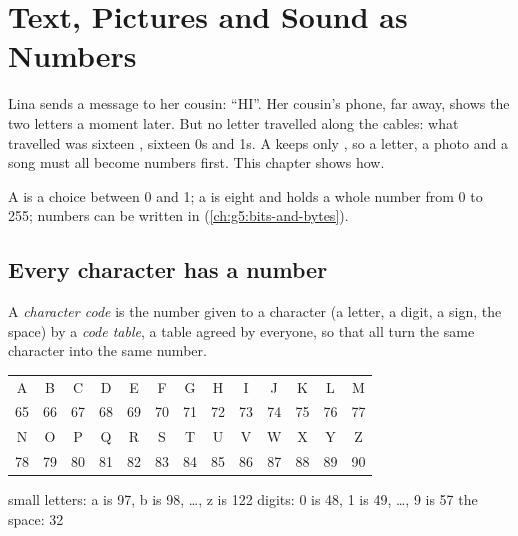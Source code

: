 \chapter{Text, Pictures and Sound as Numbers}\label{ch:g5:text-pictures-sound-as-numbers}

Lina sends a message to her cousin: ``HI''. Her cousin's phone, far away,
shows the two letters a moment later. But no letter travelled along the
cables: what travelled was sixteen , sixteen 0s and 1s. A  keeps
only , so a letter, a photo and a song must all become numbers first. This
chapter shows how.

\begin{recall}
A  is a choice between 0 and 1; a  is eight  and holds a whole
number from 0 to 255; numbers can be written in 
(\cref{ch:g5:bits-and-bytes}).
\end{recall}

\section{Every character has a number}

\begin{definition}\label{def:g5:text-pictures-sound-as-numbers:code}
A \emph{character code} is the number given to a
character (a letter, a digit, a sign, the space) by a \emph{code
table}, a table agreed by everyone, so that all 
turn the same character into the same number.
\end{definition}

\begin{center}
\small
\begin{tabular}{*{13}{c}}
\hline
A & B & C & D & E & F & G & H & I & J & K & L & M \\
65 & 66 & 67 & 68 & 69 & 70 & 71 & 72 & 73 & 74 & 75 & 76 & 77 \\
\hline
N & O & P & Q & R & S & T & U & V & W & X & Y & Z \\
78 & 79 & 80 & 81 & 82 & 83 & 84 & 85 & 86 & 87 & 88 & 89 & 90 \\
\hline
\end{tabular}

\smallskip
small letters: a is 97, b is 98, \dots, z is 122 \quad digits: 0 is 48,
1 is 49, \dots, 9 is 57 \quad the space: 32
\end{center}

